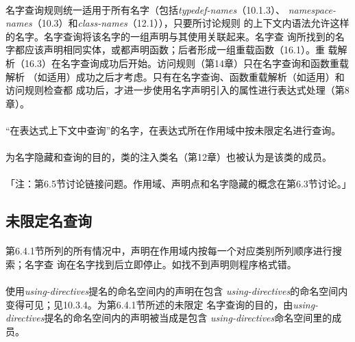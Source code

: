 \paragraph{}
名字查询规则统一适用于所有名字（包括\textit{typedef-names}（10.1.3）、
\textit{namespace-names}（10.3）和\textit{class-names}（12.1）），只要所讨论规则
的上下文内语法允许这样的名字。名字查询将该名字的一组声明与其使用关联起来。名字查
询所找到的名字都应该声明相同实体，或都声明函数；后者形成一组重载函数（16.1）。重
载解析（16.3）在名字查询成功后开始。访问规则（第14章）只在名字查询和函数重载解析
（如适用）成功之后才考虑。只有在名字查询、函数重载解析（如适用）和访问规则检查都
成功后，才进一步使用名字声明引入的属性进行表达式处理（第8章）。

\paragraph{}
``在表达式上下文中查询''的名字，在表达式所在作用域中按未限定名进行查询。

\paragraph{}
为名字隐藏和查询的目的，类的注入类名（第12章）也被认为是该类的成员。

\paragraph{}
「注：第6.5节讨论链接问题。作用域、声明点和名字隐藏的概念在第6.3节讨论。」

\subsection{未限定名查询}
\paragraph{}
第6.4.1节所列的所有情况中，声明在作用域内按每一个对应类别所列顺序进行搜索；名字查
询在名字找到后立即停止。如找不到声明则程序格式错。

\paragraph{}
使用\textit{using-directives}提名的命名空间内的声明在包含
\textit{using-directives}的命名空间内变得可见；见10.3.4。为第6.4.1节所述的未限定
名字查询的目的，由\textit{using-directives}提名的命名空间内的声明被当成是包含
\textit{using-directives}命名空间里的成员。

